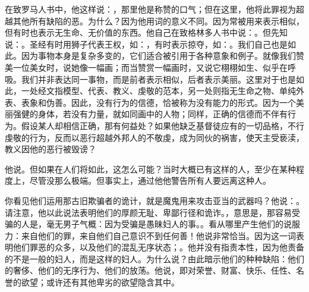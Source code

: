  \par

在致罗马人书中，他这样说：，那里他是称赞的口气；但在这里，他将此罪视为超越其他所有缺陷的恶。为什么？因为他用词的意义不同。因为常被用来表示相似，但有时也表示无生命、无价值的东西。他自己在致格林多人书中说：。但先知说：。圣经有时用狮子代表王权，如：，有时表示掠夺，如：。我们自己也是如此。因为事物本身是复杂多变的，它们适合被引用于各种意象和例子。就像我们赞美一位美女时，说她像一幅画；而当赞赏一幅画时，又说它栩栩如生、似乎在呼吸。我们并非表达同一事物，而是前者表示相似，后者表示美丽。这里对于也是如此，一处经文指模型、代表、教义、虔敬的范本，另一处则指无生命之物、单纯外表、表象和伪善。因此，没有行为的信德，恰被称为没有能力的形式。因为一个美丽强健的身体，若没有力量，就如同画中的人物；同样，正确的信德而不伴有行为。假设某人却相信正确，那有何益处？如果他缺乏基督徒应有的一切品格，不行虔敬的行为，反而以恶行超越外邦人的不敬虔，成为同伙的祸害，使天主受亵渎，教义因他的恶行被毁谤？\par

他说。但如果在人们将如此，这怎么可能？当时大概已有这样的人，至少在某种程度上，尽管没那么极端。但事实上，通过他他警告所有人要远离这种人。\par

 \par

 \par

你看见他们运用那古旧欺骗者的诡计，就是魔鬼用来攻击亚当的武器吗？他说：。请注意，他以此说法表明他们的厚颜无耻、卑鄙行径和诡诈。，意思是，那容易受骗的人是，毫无男子气概：因为受骗是愚昧妇人的事。。看从哪里产生他们的说服力：来自他们的罪，来自他们自己意识不到任何善！他说非常恰当。因为这一词表明他们罪恶的众多，以及他们的混乱无序状态；。他并没有指责本性，因为他责备的不是一般的妇人，而是这样的妇人。为什么说？由此暗示他们的种种缺陷：他们的奢侈、他们的无序行为、他们的放荡。他说，即对荣誉、财富、快乐、任性、名誉的欲望；或许还有其他卑劣的欲望隐含其中。\par

